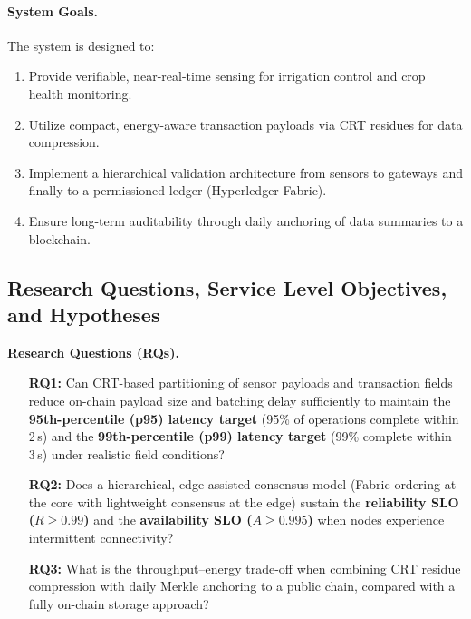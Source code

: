 \documentclass[12pt,onecolumn]{IEEEtran} %
\begin{document}
\paragraph{System Goals.} The system is designed to:
\begin{enumerate}
    \item Provide verifiable, near-real-time sensing for irrigation control and crop health monitoring.
    \item Utilize compact, energy-aware transaction payloads via CRT residues for data compression.
    \item Implement a hierarchical validation architecture from sensors to gateways and finally to a permissioned ledger (Hyperledger Fabric).
    \item Ensure long-term auditability through daily anchoring of data summaries to a blockchain.
\end{enumerate}

\subsection{Research Questions, Service Level Objectives, and Hypotheses}
\label{sec:rqs-slos}

\textbf{Research Questions (RQs).}
\begin{enumerate}
    \item[\textbf{RQ1:}] Can CRT-based partitioning of sensor payloads and transaction fields reduce on-chain payload size and batching delay sufficiently to maintain the \textbf{95th-percentile (p95) latency target} (95\% of operations complete within 2\,s) and the \textbf{99th-percentile (p99) latency target} (99\% complete within 3\,s) under realistic field conditions?
    \item[\textbf{RQ2:}] Does a hierarchical, edge-assisted consensus model (Fabric ordering at the core with lightweight consensus at the edge) sustain the \textbf{reliability SLO ($R \geq 0.99$)} and the \textbf{availability SLO ($A \geq 0.995$)} when nodes experience intermittent connectivity?
    \item[\textbf{RQ3:}] What is the throughput–energy trade-off when combining CRT residue compression with daily Merkle anchoring to a public chain, compared with a fully on-chain storage approach?
\end{enumerate}
\end{document}
